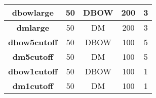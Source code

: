 \documentclass[twocolumn]{article}
\begin{document}
\begin{table*}[]
\begin{tabular}{|c|c|c|c|c|}
\textbf{dbowlarge}   & 50                                                                 & DBOW                                                        & 200                                                                    & 3                                                                   \\ \hline
\textbf{dmlarge}     & 50                                                                 & DM                                                          & 200                                                                    & 3                                                                   \\ \hline
\textbf{dbow5cutoff} & 50                                                                 & DBOW                                                        & 100                                                                    & 5                                                                   \\ \hline
\textbf{dm5cutoff}   & 50                                                                 & DM                                                          & 100                                                                    & 5                                                                   \\ \hline
\textbf{dbow1cutoff} & 50                                                                 & DBOW                                                        & 100                                                                    & 1                                                                   \\ \hline
\textbf{dm1cutoff}   & 50                                                                 & DM                                                          & 100                                                                    & 1                                                                   \\ \hline
\end{tabular}
\end{table*}
\end{document}
